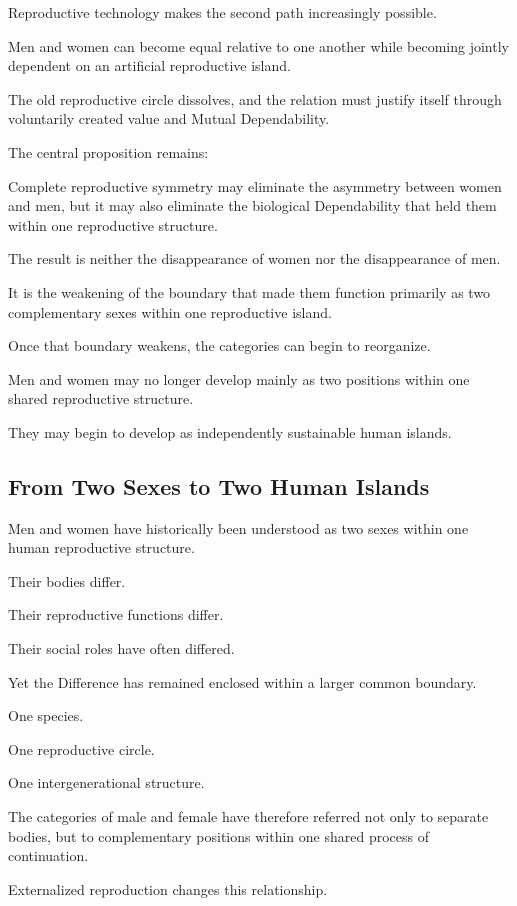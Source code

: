 Reproductive technology makes the second path increasingly possible.

Men and women can become equal relative to one another while becoming jointly dependent on an artificial reproductive island.

The old reproductive circle dissolves, and the relation must justify itself through voluntarily created value and Mutual Dependability.

The central proposition remains:

Complete reproductive symmetry may eliminate the asymmetry between women and men, but it may also eliminate the biological Dependability that held them within one reproductive structure.

The result is neither the disappearance of women nor the disappearance of men.

It is the weakening of the boundary that made them function primarily as two complementary sexes within one reproductive island.

Once that boundary weakens, the categories can begin to reorganize.

Men and women may no longer develop mainly as two positions within one shared reproductive structure.

They may begin to develop as independently sustainable human islands.

\subsection*{\textbf{From Two Sexes to Two Human Islands}} 


Men and women have historically been understood as two sexes within one human reproductive structure.

Their bodies differ.

Their reproductive functions differ.

Their social roles have often differed.

Yet the Difference has remained enclosed within a larger common boundary.

One species.

One reproductive circle.

One intergenerational structure.

The categories of male and female have therefore referred not only to separate bodies, but to complementary positions within one shared process of continuation.

Externalized reproduction changes this relationship.

